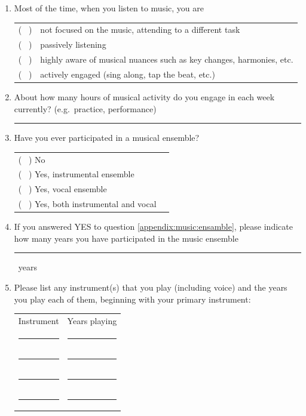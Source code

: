 \documentclass[a4paper,11pt]{article}
\newcommand{\myunderline}{\rule{2in}{.5pt}}
\begin{document}
{\begin{appendices}
\begin{enumerate}[resume]
	\item Most of the time, when you listen to music, you are

	\begin{tabular}{l l}
		( \ ) & not focused on the music, attending to a different task \\
		( \ ) & passively listening \\
		( \ ) & highly aware of musical nuances such as key changes, harmonies, etc. \\
		( \ ) & actively engaged (sing along, tap the beat, etc.) \\
	\end{tabular}

	\item About how many hours of musical activity do you engage in each week currently? (e.g.\ practice, performance)

	\myunderline

	\item \label{appendix:music:ensamble}Have you ever participated in a musical ensemble?

	\begin{tabular}{l l}
		( \ ) No \\
		( \ ) Yes, instrumental ensemble \\
		( \ ) Yes, vocal ensemble \\
		( \ ) Yes, both instrumental and vocal \\
	\end{tabular}

	\item If you answered YES to question \ref{appendix:music:ensamble}, please indicate how many years you have participated in the music ensemble

	\myunderline \ years

	\item Please list any instrument(s) that you play (including voice) and the years you play each of them, beginning with your primary instrument:

	\begin{tabular}{c c}
		Instrument &  Years playing \\
		\myunderline & \myunderline \\
		\myunderline & \myunderline \\
		\myunderline & \myunderline \\
		\myunderline & \myunderline \\
	\end{tabular}


\end{enumerate}
\end{appendices}}
\end{document}
